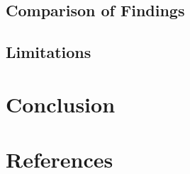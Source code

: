 \documentclass{article}
\begin{document}
\subsection{Comparison of Findings}

\subsection{Limitations}

\section{Conclusion}

\section{References}
% 
% 
\end{document}
